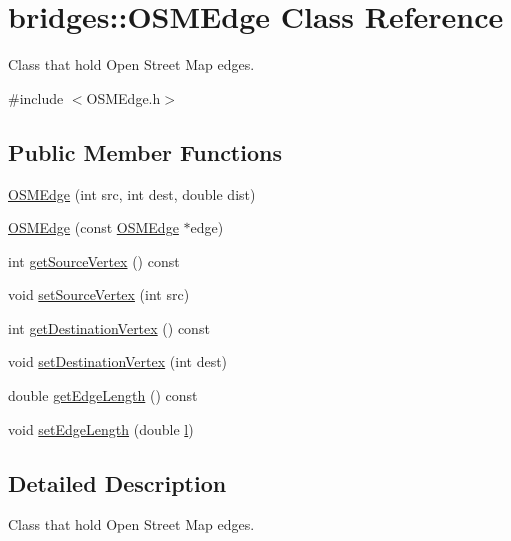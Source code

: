 \hypertarget{classbridges_1_1_o_s_m_edge}{}\section{bridges\+::O\+S\+M\+Edge Class Reference}
\label{classbridges_1_1_o_s_m_edge}


Class that hold Open Street Map edges.  




{\ttfamily \#include $<$O\+S\+M\+Edge.\+h$>$}

\subsection*{Public Member Functions}
\begin{DoxyCompactItemize}
\item 
\mbox{\hyperlink{classbridges_1_1_o_s_m_edge_ace6b587439a5c3957f72a9d48e9782eb}{O\+S\+M\+Edge}} (int src, int dest, double dist)
\item 
\mbox{\hyperlink{classbridges_1_1_o_s_m_edge_ab76af0cbc8a84362edc6912e243ff2ef}{O\+S\+M\+Edge}} (const \mbox{\hyperlink{classbridges_1_1_o_s_m_edge}{O\+S\+M\+Edge}} $\ast$edge)
\item 
int \mbox{\hyperlink{classbridges_1_1_o_s_m_edge_a0779634f83c4b386d10bbfd722a0f0b7}{get\+Source\+Vertex}} () const
\item 
void \mbox{\hyperlink{classbridges_1_1_o_s_m_edge_a32f40057bf1f58a4778e346b27143e8e}{set\+Source\+Vertex}} (int src)
\item 
int \mbox{\hyperlink{classbridges_1_1_o_s_m_edge_a6bdd47593d6d0ecd05f516085db98b61}{get\+Destination\+Vertex}} () const
\item 
void \mbox{\hyperlink{classbridges_1_1_o_s_m_edge_abfa6c323ee87dbba16fd56ddf925286d}{set\+Destination\+Vertex}} (int dest)
\item 
double \mbox{\hyperlink{classbridges_1_1_o_s_m_edge_a3cb7d8550367d382ec712d08eb5e48db}{get\+Edge\+Length}} () const
\item 
void \mbox{\hyperlink{classbridges_1_1_o_s_m_edge_aa1572ac5cc99e423d0a7210151bf0877}{set\+Edge\+Length}} (double \mbox{\hyperlink{namespacebridges_acfb0a4f7877d8f63de3e6862004c50eda2db95e8e1a9267b7a1188556b2013b33}{l}})
\end{DoxyCompactItemize}


\subsection{Detailed Description}
Class that hold Open Street Map edges. 

